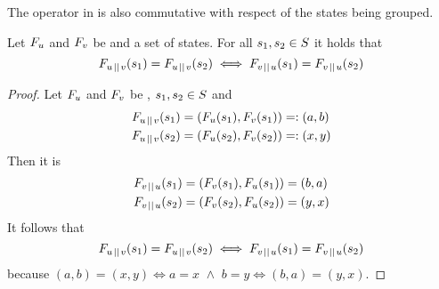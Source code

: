 \documentclass[preview]{standalone}
\begin{document}
The operator \pll in \gfctpll is also commutative with respect of the states being grouped.

\begin{proposition}
	Let $\grpfct[u]$ and $\grpfct[v]$ be \grpfctsN and \states a set of states. For all $\state_1, \state_2 \in \states$ it holds that
	\[
	\grpfct[u \pll v](\state_1) = \grpfct[u \pll v](\state_2) \iff \grpfct[v \pll u](\state_1) = \grpfct[v \pll u](\state_2)
	\]
\end{proposition}

\begin{proof}
Let $\grpfct[u]$ and $\grpfct[v]$ be \grpfctsN, $\state_1, \state_2 \in \states$ and
\begin{align*}
	\grpfct[u \pll v](\state_1) &= (\grpfct[u](\state_1), \grpfct[v](\state_1)) =: (a, b) \\
	\grpfct[u \pll v](\state_2) &= (\grpfct[u](\state_2), \grpfct[v](\state_2)) =: (x, y)			
\end{align*}
Then it is
\begin{align*}
	\grpfct[v \pll u](\state_1) &= (\grpfct[v](\state_1), \grpfct[u](\state_1)) = (b, a) \\
	\grpfct[v \pll u](\state_2) &= (\grpfct[v](\state_2), \grpfct[u](\state_2)) = (y, x)
\end{align*}
It follows that
\[
	\grpfct[u \pll v](\state_1) = \grpfct[u \pll v](\state_2) \iff \grpfct[v \pll u](\state_1) = \grpfct[v \pll u](\state_2)
\]
because $(a, b) = (x, y) \iff a = x \,\, \land \,\, b = y \iff (b, a) = (y, x)$.

	
\end{proof}


\end{document}
